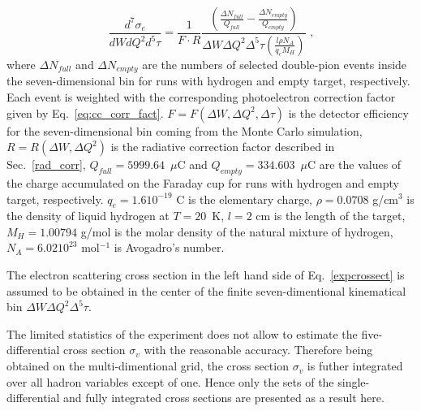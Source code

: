 \documentclass[prc,twocolumn,superscriptaddress,showpacs,amssymb,amsmath,amsfonts,linenumbers,aps]{revtex4-1}
\begin{document}
 
\begin{equation}
\frac{d^{7}\sigma_{e}}{dWdQ^{2}d^{5}\tau} = \frac{1}{F \cdot R} 
\frac{\left( \frac{\Delta N_{full}}{Q_{full}}-\frac{\Delta N_{empty}}{Q_{empty}} \right)}{
\Delta W \Delta Q^{2} \Delta^{5} \tau \left( \frac{l \rho N_{A}}{q_{e}M_{H}} \right)} \textrm{ ,}
\label{expcrossect}
\end{equation}
where $\Delta N_{full}$ and $\Delta N_{empty}$ are the numbers of selected double-pion events inside the
seven-dimensional bin for runs with hydrogen and
empty target, respectively. 
Each event is weighted with the corresponding photoelectron correction factor given by Eq.~\ref{eq:cc_corr_fact}.
 $F = F(\Delta W, \Delta Q^{2}, \Delta \tau)$ is the detector efficiency for the seven-dimensional bin
 coming from the  Monte Carlo simulation,
$R = R(\Delta W, \Delta Q^{2})$ is the
radiative correction factor described in Sec.~\ref{rad_corr},  $Q_{full}= 5999.64$~$\mu$C and $Q_{empty} = 334.603$~$\mu$C are the  values of the charge accumulated on the Faraday cup for runs with hydrogen and empty target, respectively. $q_{e} =1.610^{-19}$ C is the elementary charge, $\rho = 0.0708$  g/cm$^{3}$ is the density of liquid hydrogen at $T = 20$~K,
$l = 2$ cm is the length of the target, $M_{H} = 1.00794$ g/mol is the molar density of
the natural mixture of hydrogen,  $N_{A} =6.0210^{23}$ mol$^{-1}$ is Avogadro's
number.

The electron scattering cross section in the left hand side of Eq.~\ref{expcrossect} is assumed to be obtained in the center of the finite seven-dimentional kinematical bin $\Delta W \Delta Q^{2} \Delta^{5} \tau$.





The limited
statistics of the experiment does not allow to estimate
the five-differential cross section $\sigma_{v}$ with the reasonable
accuracy. Therefore being obtained on the multi-dimentional grid, the cross section $\sigma_{v}$ is futher integrated over all hadron variables except of one. Hence only the sets of the single-differential and fully integrated cross sections are presented as a result here.
\end{document}
